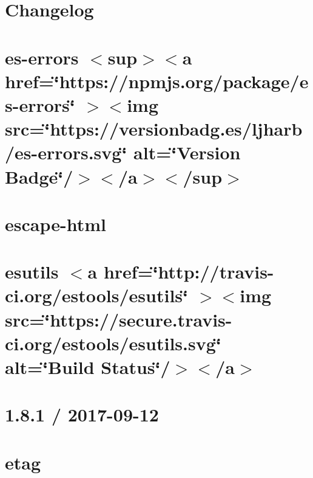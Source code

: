 \documentclass[twoside]{book}
\newcommand{\+}{\discretionary{\mbox{\scriptsize$\hookleftarrow$}}{}{}}
\begin{document}
\chapter{Changelog}
\label{md_Backend_nodejs_node_modules_es_errors_CHANGELOG}

\chapter{es-\/errors \texorpdfstring{$<$}{<}sup\texorpdfstring{$>$}{>}\texorpdfstring{$<$}{<}a href=\char`\"{}https\+://npmjs.\+org/package/es-\/errors\char`\"{} \texorpdfstring{$>$}{>}\texorpdfstring{$<$}{<}img src=\char`\"{}https\+://versionbadg.\+es/ljharb/es-\/errors.\+svg\char`\"{} alt=\char`\"{}\+Version Badge\char`\"{}/\texorpdfstring{$>$}{>}\texorpdfstring{$<$}{<}/a\texorpdfstring{$>$}{>}\texorpdfstring{$<$}{<}/sup\texorpdfstring{$>$}{>}}
\label{md_Backend_nodejs_node_modules_es_errors_README}

\chapter{escape-\/html}
\label{md_Backend_nodejs_node_modules_escape_html_Readme}

\chapter{esutils \texorpdfstring{$<$}{<}a href=\char`\"{}http\+://travis-\/ci.\+org/estools/esutils\char`\"{} \texorpdfstring{$>$}{>}\texorpdfstring{$<$}{<}img src=\char`\"{}https\+://secure.\+travis-\/ci.\+org/estools/esutils.\+svg\char`\"{} alt=\char`\"{}\+Build Status\char`\"{}/\texorpdfstring{$>$}{>}\texorpdfstring{$<$}{<}/a\texorpdfstring{$>$}{>}}
\label{md_Backend_nodejs_node_modules_esutils_README}

\chapter{1.8.1 / 2017-\/09-\/12}
\label{md_Backend_nodejs_node_modules_etag_HISTORY}

\chapter{etag}
\label{md_Backend_nodejs_node_modules_etag_README}

\end{document}
